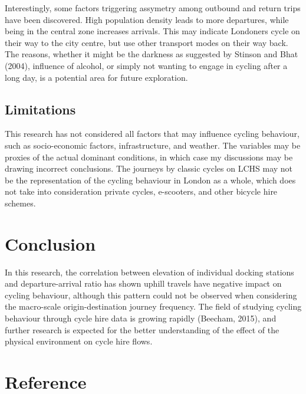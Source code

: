 \documentclass[
  12pt,
  a4paper,
  DIV=11,
  numbers=noendperiod]{scrartcl}
\begin{document}
Interestingly, some factors triggering assymetry among outbound and
return trips have been discovered. High population density leads to more
departures, while being in the central zone increases arrivals. This may
indicate Londoners cycle on their way to the city centre, but use other
transport modes on their way back. The reasons, whether it might be the
darkness as suggested by Stinson and Bhat (2004), influence of alcohol,
or simply not wanting to engage in cycling after a long day, is a
potential area for future exploration.

\hypertarget{limitations}{%
\subsection{Limitations}\label{limitations}}

This research has not considered all factors that may influence cycling
behaviour, such as socio-economic factors, infrastructure, and weather.
The variables may be proxies of the actual dominant conditions, in which
case my discussions may be drawing incorrect conclusions. The journeys
by classic cycles on LCHS may not be the representation of the cycling
behaviour in London as a whole, which does not take into consideration
private cycles, e-scooters, and other bicycle hire schemes.

\hypertarget{conclusion}{%
\section{Conclusion}\label{conclusion}}

In this research, the correlation between elevation of individual
docking stations and departure-arrival ratio has shown uphill travels
have negative impact on cycling behaviour, although this pattern could
not be observed when considering the macro-scale origin-destination
journey frequency. The field of studying cycling behaviour through cycle
hire data is growing rapidly (Beecham, 2015), and further research is
expected for the better understanding of the effect of the physical
environment on cycle hire flows.

\hypertarget{reference}{%
\section*{Reference}\label{reference}}
\end{document}
